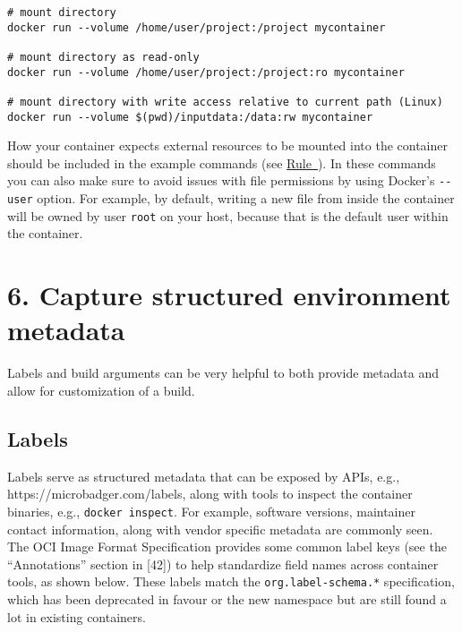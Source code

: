 \documentclass[10pt,letterpaper]{article}
\begin{document}
\begin{verbatim}
# mount directory
docker run --volume /home/user/project:/project mycontainer

# mount directory as read-only
docker run --volume /home/user/project:/project:ro mycontainer

# mount directory with write access relative to current path (Linux)
docker run --volume $(pwd)/inputdata:/data:rw mycontainer
\end{verbatim}

How your container expects external resources to be mounted into the
container should be included in the example commands (see
\hyperref[{rule:formatting}]{Rule~}). In
these commands you can also make sure to avoid issues with file
permissions by using Docker's \texttt{-\/-user} option. For example, by
default, writing a new file from inside the container will be owned by
user \texttt{root} on your host, because that is the default user within
the container.

\hypertarget{capture-structured-environment-metadata}{%
\section*{6. Capture structured environment
metadata}\label{capture-structured-environment-metadata}}

  \label{rule:metadata} 

Labels and build arguments can be very helpful to both provide metadata
and allow for customization of a build.

\hypertarget{labels}{%
\subsection{Labels}\label{labels}}

Labels serve as structured metadata that can be exposed by APIs, e.g.,
https://microbadger.com/labels, along with tools to inspect the
container binaries, e.g., \texttt{docker\ inspect}. For example,
software versions, maintainer contact information, along with vendor
specific metadata are commonly seen. The OCI Image Format Specification
provides some common label keys (see the ``Annotations'' section in
{[}42{]}) to help standardize field names across container tools, as
shown below. These labels match the \texttt{org.label-schema.*}
specification, which has been deprecated in favour or the new namespace
but are still found a lot in existing containers.
\end{document}

